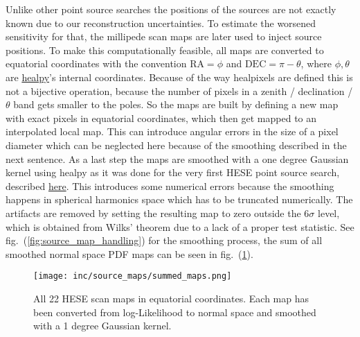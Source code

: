 Unlike other point source searches the positions of the sources are not exactly known due to our reconstruction uncertainties.
To estimate the worsened sensitivity for that, the millipede scan maps are later used to inject source positions.
To make this computationally feasible, all maps are converted to equatorial coordinates with the convention $\mathrm{RA} = \phi$ and $\mathrm{DEC} = \pi - \theta$, where $\phi, \theta$ are \href{https://healpy.readthedocs.io/en/latest/}{healpy}'s internal coordinates.
Because of the way healpixels are defined this is not a bijective operation, because the number of pixels in a zenith / declination / $\theta$ band gets smaller to the poles.
So the maps are built by defining a new map with exact pixels in equatorial coordinates, which then get mapped to an interpolated local map.
This can introduce angular errors in the size of a pixel diameter which can be neglected here because of the smoothing described in the next sentence.
As a last step the maps are smoothed with a one degree Gaussian kernel using healpy as it was done for the very first HESE point source search, described \href{https://wiki.icecube.wisc.edu/index.php/High-Energy_Starting_Event_Point_Source_Searches#Effects_of_Binning.2C_Rotation.2C_and_Smoothing}{here}.
This introduces some numerical errors because the smoothing happens in spherical harmonics space which has to be truncated numerically.
The artifacts are removed by setting the resulting map to zero outside the $6\sigma$ level, which is obtained from Wilks' theorem due to a lack of a proper test statistic.
See fig.~(\ref{fig:source_map_handling}) for the smoothing process, the sum of all smoothed normal space PDF maps can be seen in fig.~(\ref{fig:hese_maps_all}).

\begin{figure}[h]
  \centering
  \texttt{[image: inc/source\_maps/summed\_maps.png]}
  \caption{All 22 HESE scan maps in equatorial coordinates. Each map has been converted from log-Likelihood to normal space and smoothed with a 1 degree Gaussian kernel.}
  \label{fig:hese_maps_all}
\end{figure}

